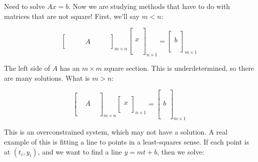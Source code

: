 \documentclass[12pt]{article}
\newcommand{\<}{\langle}
\renewcommand{\>}{\rangle}
\begin{document}
Need to solve $Ax = b$. Now we are studying methods that have to do with matrices that are not square! First, we'll say $m < n$:

\[
	\begin{bmatrix}
		& & & & & & \\
		& & & A & & & \\
		& & & & & &
	\end{bmatrix}_{m \times n}
	\begin{bmatrix}
		\\ \\ \\ x \\ \\ \\ \\
	\end{bmatrix}_{n \times 1} =
	\begin{bmatrix}
		\\ b \\ \\
	\end{bmatrix}_{m \times 1}
\]

The left side of $A$ has an $m \times m$ square section. This is underdetermined, so there are many solutions. What is $m > n$:

\[
	\begin{bmatrix}
		\\
		 \\
		& A &\\
		\\
		\\
	\end{bmatrix}_{m \times n}
	\begin{bmatrix}
		\\ x \\ \\
	\end{bmatrix}_{n \times 1} =
	\begin{bmatrix}
		\\ \\ \\ b \\ \\ \\ \\
	\end{bmatrix}_{m \times 1}
\]

This is an overconstrained system, which may not have a solution. A real example of this is fitting a line to points in a least-squares sense. If each point is at $(t_i, y_i)$, and we want to find a line $y = mt + b$, then we solve:
\end{document}
